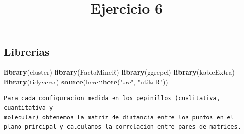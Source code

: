 \documentclass[
]{article}
\title{Ejercicio 6}
\author{}
\date{\vspace{-2.5em}}
\newenvironment{Shaded}{\begin{snugshade}}{\end{snugshade}}
\newcommand{\DecValTok}[1]{\textcolor[rgb]{0.00,0.00,0.81}{#1}}
\newcommand{\KeywordTok}[1]{\textcolor[rgb]{0.13,0.29,0.53}{\textbf{#1}}}
\newcommand{\NormalTok}[1]{#1}
\newcommand{\OperatorTok}[1]{\textcolor[rgb]{0.81,0.36,0.00}{\textbf{#1}}}
\newcommand{\StringTok}[1]{\textcolor[rgb]{0.31,0.60,0.02}{#1}}
\begin{document}
\maketitle

\hypertarget{librerias}{%
\subsection{Librerias}\label{librerias}}

\begin{Shaded}
\begin{Highlighting}[]
\KeywordTok{library}\NormalTok{(cluster)}
\KeywordTok{library}\NormalTok{(FactoMineR)}
\KeywordTok{library}\NormalTok{(ggrepel)}
\KeywordTok{library}\NormalTok{(kableExtra)}
\KeywordTok{library}\NormalTok{(tidyverse)}
\KeywordTok{source}\NormalTok{(here}\OperatorTok{::}\KeywordTok{here}\NormalTok{(}\StringTok{"src"}\NormalTok{, }\StringTok{"utils.R"}\NormalTok{))}
\end{Highlighting}
\end{Shaded}

\begin{verbatim}
Para cada configuracion medida en los pepinillos (cualitativa, cuantitativa y
molecular) obtenemos la matriz de distancia entre los puntos en el
plano principal y calculamos la correlacion entre pares de matrices.
\end{verbatim}

\begin{Shaded}
\end{Shaded}
\end{document}
